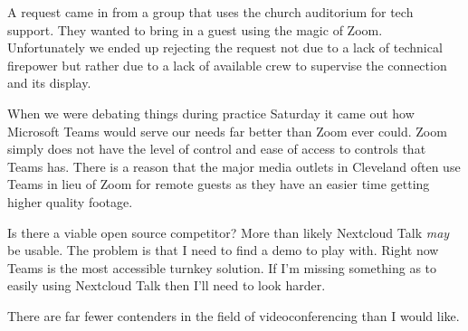 A request came in from a group that uses the church auditorium for tech
support. They wanted to bring in a guest using the magic of Zoom.
Unfortunately we ended up rejecting the request not due to a lack of
technical firepower but rather due to a lack of available crew to
supervise the connection and its display.

When we were debating things during practice Saturday it came out how
Microsoft Teams would serve our needs far better than Zoom ever could.
Zoom simply does not have the level of control and ease of access to
controls that Teams has. There is a reason that the major media outlets
in Cleveland often use Teams in lieu of Zoom for remote guests as they
have an easier time getting higher quality footage.

Is there a viable open source competitor? More than likely Nextcloud
Talk \emph{may} be usable. The problem is that I need to find a demo to
play with. Right now Teams is the most accessible turnkey solution. If
I'm missing something as to easily using Nextcloud Talk then I'll need
to look harder.

There are far fewer contenders in the field of videoconferencing than I
would like.
